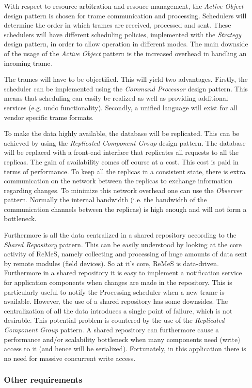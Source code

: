 \npar With respect to resource arbitration and resouce management, the
\emph{Active Object} design pattern is chosen for trame communication and
processing. Schedulers will determine the order in which trames are received,
processed and sent. These schedulers will have different scheduling policies,
implemented with the \emph{Strategy} design pattern, in order to allow operation
in different modes. The main downside of the usage of the \emph{Active Object}
pattern is the increased overhead in handling an incoming trame. 

\npar The trames will have to be objectified. This will yield two advantages.
Firstly, the scheduler can be implemented using the \emph{Command Processor}
design pattern. This means that scheduling can easily be realized as well as
providing additional services (e.g. undo functionality). Secondly, a
unified language will exist for all vendor specific trame formats.

\npar To make the data highly available, the database will be replicated. This
can be achieved by using the \emph{Replicated Component Group} design pattern.
The database will be replaced with a front-end interface that replicates all
requests to all the replicas. The gain of availability comes off course at a
cost. This cost is paid in terms of performance. To keep all the replicas in a
consistent state, there is extra communication on the network between the
replicas to exchange information regarding changes. To minimize this network
overhead one can use the \emph{Observer} pattern. Normally the internal
bandwidth (i.e. the bandwidth of the communication channels between the
replicas) is high enough and will not form a bottleneck.

\npar Furthermore is all the data centralized in a shared repository according
to the \emph{Shared Repository} pattern. This can be easily understood by
looking at the core activity of ReMeS, namely collecting and processing of huge
amounts of data sent by remote modules (field devices). So at it's core, ReMeS
is data-driven. Furthermore in a shared repository it is easy to implement a
notification service for application components when changes are made in the
repository. This is particularly useful to notify the Processing scheduler when
a new trame is available. However, the use of a shared repository has some
downsides. The centralization of all the data introduces a single point of
failure, which is not desirable. This potential problem is countered by the use
of the \emph{Replicated Component Group} pattern. A shared repository can
furthermore cause a performance and/or scalability bottleneck when many
components need (write) access to it (and hence will be serialized).
Fortunately, in this application there is no need for massive concurrent write
access.

\subsubsection{Other requirements}
\label{others:whole-system}





